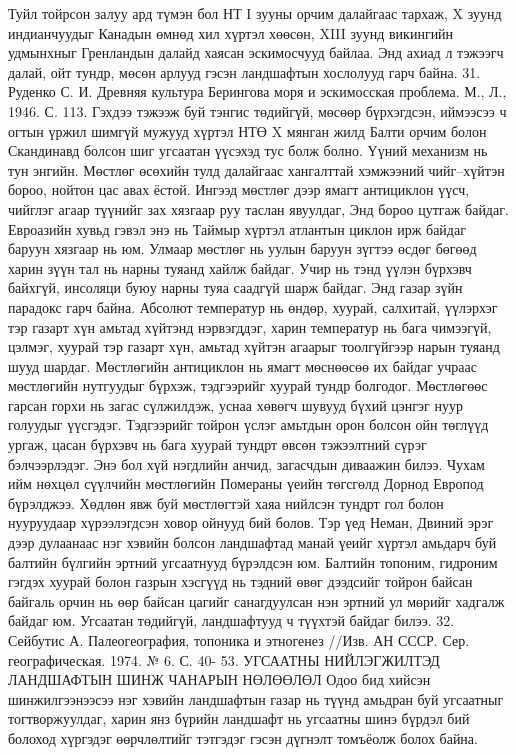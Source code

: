 Туйл тойрсон залуу ард түмэн бол НТ I зууны орчим далайгаас тархаж, X зуунд индианчуудыг Канадын өмнөд хил хүртэл хөөсөн, XIII зуунд викингийн удмынхныг Гренландын далайд хаясан эскимосчууд байлаа. Энд ахиад л тэжээгч далай, ойт тундр, мөсөн арлууд гэсэн ландшафтын хослолууд гарч байна. 31. Руденко С. И. Древняя культура Берингова моря и эскимосская проблема. М., Л., 1946. С. 113.
Гэхдээ тэжээж буй тэнгис төдийгүй, мөсөөр бүрхэгдсэн, иймээсээ ч огтын үржил шимгүй мужууд хүртэл НТӨ X мянган жилд Балти орчим болон Скандинавд болсон шиг угсаатан үүсэхэд тус болж болно. Үүний механизм нь тун энгийн.
Мөстлөг өсөхийн тулд далайгаас хангалттай хэмжээний чийг–хүйтэн бороо, нойтон цас авах ёстой. Ингээд мөстлөг дээр ямагт антициклон үүсч, чийглэг агаар түүнийг зах хязгаар руу таслан явуулдаг, Энд бороо цутгаж байдаг. Евроазийн хувьд гэвэл энэ нь Таймыр хүртэл атлантын циклон ирж байдаг баруун хязгаар нь юм. Улмаар мөстлөг нь уулын баруун зүгтээ өсдөг бөгөөд харин зүүн тал нь нарны туяанд хайлж байдаг. Учир нь тэнд үүлэн бүрхэвч байхгүй, инсоляци буюу нарны туяа саадгүй шарж байдаг.
Энд газар зүйн парадокс гарч байна. Абсолют температур нь өндөр, хуурай, салхитай, үүлэрхэг тэр газарт хүн амьтад хүйтэнд нэрвэгддэг, харин температур нь бага чимээгүй, цэлмэг, хуурай тэр газарт хүн, амьтад хүйтэн агаарыг тоолгүйгээр нарын туяанд шууд шардаг. Мөстлөгийн антициклон нь ямагт мөснөөсөө их байдаг учраас мөстлөгийн нутгуудыг бүрхэж, тэдгээрийг хуурай тундр болгодог. Мөстлөгөөс гарсан горхи нь загас сүлжилдэж, уснаа хөвөгч шувууд бүхий цэнгэг нуур голуудыг үүсгэдэг. Тэдгээрийг тойрон үслэг амьтдын орон болсон ойн төглүүд ургаж, цасан бүрхэвч нь бага хуурай тундрт өвсөн тэжээлтний сүрэг бэлчээрлэдэг. Энэ бол хүй нэгдлийн анчид, загасчдын диваажин билээ.
Чухам ийм нөхцөл сүүлчийн мөстлөгийн Помераны үеийн төгсгөлд Дорнод Европод бүрэлджээ. Хөдлөн явж буй мөстлөгтэй хаяа нийлсэн тундрт гол болон нууруудаар хүрээлэгдсэн ховор ойнууд бий болов. Тэр үед Неман, Двиний эрэг дээр дулаанаас нэг хэвийн болсон ландшафтад манай үеийг хүртэл амьдарч буй балтийн бүлгийн эртний угсаатнууд бүрэлдсэн юм. Балтийн топоним, гидроним гэгдэх хуурай болон газрын хэсгүүд нь тэдний өвөг дээдсийг тойрон байсан байгаль орчин нь өөр байсан цагийг санагдуулсан нэн эртний ул мөрийг хадгалж байдаг юм. Угсаатан төдийгүй, ландшафтууд ч түүхтэй байдаг билээ. 32. Сейбутис А. Палеогеография, топоника и этногенез //Изв. АН СССР. Сер. географическая. 1974. № 6. С. 40- 53.
УГСААТНЫ НИЙЛЭГЖИЛТЭД ЛАНДШАФТЫН ШИНЖ ЧАНАРЫН НӨЛӨӨЛӨЛ
Одоо бид хийсэн шинжилгээнээсээ нэг хэвийн ландшафтын газар нь түүнд амьдран буй угсаатныг тогтворжуулдаг, харин янз бүрийн ландшафт нь угсаатны шинэ бүрдэл бий болоход хүргэдэг өөрчлөлтийг тэтгэдэг гэсэн дүгнэлт томъёолж болох байна.
